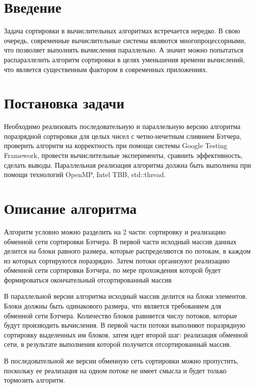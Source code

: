 \documentclass{report}
\begin{document}
\setcounter{page}{2}

\tableofcontents
\newpage

\section*{Введение}
\par Задача сортировки в вычислительных алгоритмах встречается нередко. В свою очередь, современные вычислительные системы являются многопроцессорными, что позволяет выполнять вычисления параллельно. А значит можно попытаться распараллелить алгоритм сортировки в целях уменьшения времени вычислений, что является существенным фактором в современных приложениях.
\newpage

\section*{Постановка задачи}
\par Необходимо реализовать последовательную и параллельную версию алгоритма поразрядной сортировки для целых чисел с четно-нечетным слиянием Бэтчера, проверить алгоритм на корректность при помощи системы Google Testing Framework, провести вычислительные эксперименты, сравнить эффективность, сделать выводы. Параллельная реализация алгоритма должна быть выполнена при помощи технологий OpenMP, Intel TBB, std::thread.
\newpage

\section*{Описание алгоритма}
\par Алгоритм условно можно разделить на 2 части: сортировку и реализацию обменной сети сортировки Бэтчера. В первой части исходный массив данных делится на блоки равного размера, которые распределяются по потокам, в каждом из которых сортируются поразрядно. Затем потоки организуют реализацию обменной сети сортировки Бэтчера, по мере прохождения которой будет формироваться окончательный отсортированный массив 
\par В параллельной версии алгоритма исходный массив делится на блоки элементов. Блоки должны быть одинакового размера, что является требованием для обменной сети Бэтчера. Количество блоков равняется числу потоков, которые будут производить вычисления. В первой части потоки выполняют поразрядную сортировку выделенных им блоков, затем идет второй шаг: реализация обменной сети, в результате выполнения которой получится отсортированный массив.
\par В последовательной же версии обменную сеть сортировки можно пропустить, поскольку ее реализация на одном потоке не имеет смысла и будет только тормозить алгоритм.
\end{document}
